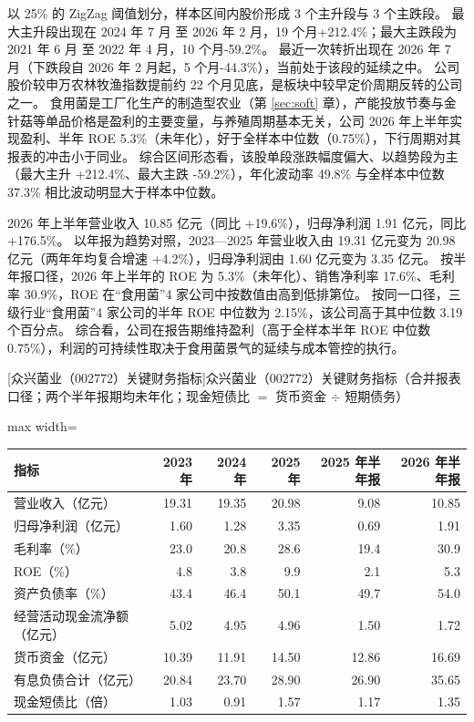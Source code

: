  以 25\% 的 ZigZag 阈值划分，样本区间内股价形成 3 个主升段与 3 个主跌段。 最大主升段出现在 2024 年 7 月 至 2026 年 2 月，19 个月+212.4\%；最大主跌段为 2021 年 6 月 至 2022 年 4 月，10 个月-59.2\%。 最近一次转折出现在 2026 年 7 月（下跌段自 2026 年 2 月起，5 个月-44.3\%），当前处于该段的延续之中。 公司股价较申万农林牧渔指数提前约 22 个月见底，是板块中较早定价周期反转的公司之一。 食用菌是工厂化生产的制造型农业（第 \ref{sec:soft} 章），产能投放节奏与金针菇等单品价格是盈利的主要变量，与养殖周期基本无关，公司 2026 年上半年实现盈利、半年 ROE 5.3\%（未年化），好于全样本中位数（0.75\%），下行周期对其报表的冲击小于同业。 综合区间形态看，该股单段涨跌幅度偏大、以趋势段为主（最大主升 +212.4\%、最大主跌 -59.2\%），年化波动率 49.8\% 与全样本中位数 37.3\% 相比波动明显大于样本中位数。

 2026 年上半年营业收入 10.85 亿元（同比 +19.6\%），归母净利润 1.91 亿元，同比 +176.5\%。 以年报为趋势对照，2023---2025 年营业收入由 19.31 亿元变为 20.98 亿元（两年年均复合增速 +4.2\%），归母净利润由 1.60 亿元变为 3.35 亿元。 按半年报口径，2026 年上半年的 ROE 为 5.3\%（未年化）、销售净利率 17.6\%、毛利率 30.9\%，ROE 在“食用菌”4 家公司中按数值由高到低排第位。 按同一口径，三级行业“食用菌”4 家公司的半年 ROE 中位数为 2.15\%，该公司高于其中位数 3.19 个百分点。 综合看，公司在报告期维持盈利（高于全样本半年 ROE 中位数 0.75\%），利润的可持续性取决于食用菌景气的延续与成本管控的执行。

\begin{center}\small\setlength{\tabcolsep}{3.4pt}
[众兴菌业（002772）关键财务指标]{众兴菌业（002772）关键财务指标（合并报表口径；两个半年报期均未年化；现金短债比 $=$ 货币资金 $\div$ 短期债务）}
\begin{adjustbox}{max width=\textwidth}
\begin{tabular}{@{}lrrrrr@{}}
\toprule
指标 & 2023 年 & 2024 年 & 2025 年 & 2025 年半年报 & 2026 年半年报 \\
\midrule
营业收入（亿元） & 19.31 & 19.35 & 20.98 & 9.08 & 10.85 \\
归母净利润（亿元） & 1.60 & 1.28 & 3.35 & 0.69 & 1.91 \\
毛利率（\%） & 23.0 & 20.8 & 28.6 & 19.4 & 30.9 \\
ROE（\%） & 4.8 & 3.8 & 9.9 & 2.1 & 5.3 \\
资产负债率（\%） & 43.4 & 46.4 & 50.1 & 49.7 & 54.0 \\
经营活动现金流净额（亿元） & 5.02 & 4.95 & 4.96 & 1.50 & 1.72 \\
货币资金（亿元） & 10.39 & 11.91 & 14.50 & 12.86 & 16.69 \\
有息负债合计（亿元） & 20.84 & 23.70 & 28.90 & 26.90 & 35.65 \\
现金短债比（倍） & 1.03 & 0.91 & 1.57 & 1.17 & 1.35 \\
\bottomrule
\end{tabular}
\end{adjustbox}
\end{center}

